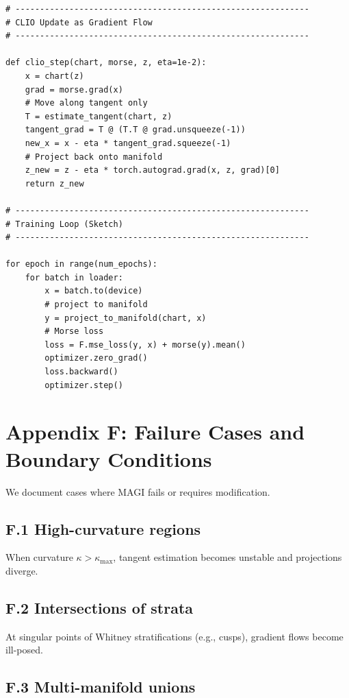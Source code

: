 \documentclass[11pt,a4paper,twocolumn]{article}
\begin{document}
\begin{verbatim}
# ------------------------------------------------------------
# CLIO Update as Gradient Flow
# ------------------------------------------------------------

def clio_step(chart, morse, z, eta=1e-2):
    x = chart(z)
    grad = morse.grad(x)
    # Move along tangent only
    T = estimate_tangent(chart, z)
    tangent_grad = T @ (T.T @ grad.unsqueeze(-1))
    new_x = x - eta * tangent_grad.squeeze(-1)
    # Project back onto manifold
    z_new = z - eta * torch.autograd.grad(x, z, grad)[0]
    return z_new

# ------------------------------------------------------------
# Training Loop (Sketch)
# ------------------------------------------------------------

for epoch in range(num_epochs):
    for batch in loader:
        x = batch.to(device)
        # project to manifold
        y = project_to_manifold(chart, x)
        # Morse loss
        loss = F.mse_loss(y, x) + morse(y).mean()
        optimizer.zero_grad()
        loss.backward()
        optimizer.step()
\end{verbatim}



\section*{Appendix F: Failure Cases and Boundary Conditions} 

We document cases where MAGI fails or requires modification.

\subsection*{F.1 High-curvature regions}

When curvature $\kappa > \kappa_{\max}$, tangent estimation becomes unstable and projections diverge.

\subsection*{F.2 Intersections of strata}

At singular points of Whitney stratifications (e.g., cusps), gradient flows become ill-posed.

\subsection*{F.3 Multi-manifold unions}
\end{document}
